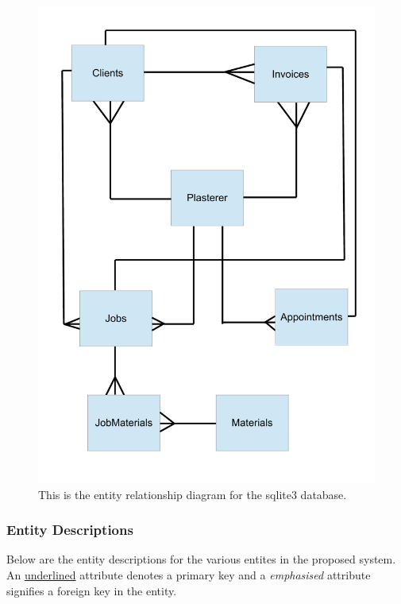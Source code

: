 \begin{figure}[H]
    \includegraphics[width=\textwidth]{./Analysis/images/ERDiagram.pdf}
    \caption{This is the entity relationship diagram for the sqlite3 database.} \label{fig:Entity_Relationship_Diagram}
\end{figure}

\subsubsection{Entity Descriptions}

\begin{flushleft}

Below are the entity descriptions for the various entites in the proposed system. An \underline{underlined} attribute denotes a primary key and a \emph{emphasised}	attribute signifies a foreign key in the entity.

\end{flushleft}




